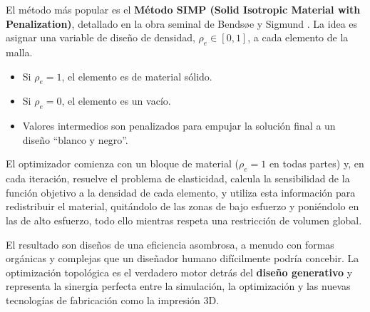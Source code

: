 El método más popular es el \textbf{Método SIMP (Solid Isotropic Material with Penalization)}, detallado en la obra seminal de Bendsøe y Sigmund \cite{Bendsoe2003}. La idea es asignar una variable de diseño de densidad, \(\rho_e \in [0,1]\), a cada elemento de la malla.
\begin{itemize}
    \item Si \(\rho_e = 1\), el elemento es de material sólido.
    \item Si \(\rho_e = 0\), el elemento es un vacío.
    \item Valores intermedios son penalizados para empujar la solución final a un diseño ``blanco y negro''.
\end{itemize}
El optimizador comienza con un bloque de material (\(\rho_e=1\) en todas partes) y, en cada iteración, resuelve el problema de elasticidad, calcula la sensibilidad de la función objetivo a la densidad de cada elemento, y utiliza esta información para redistribuir el material, quitándolo de las zonas de bajo esfuerzo y poniéndolo en las de alto esfuerzo, todo ello mientras respeta una restricción de volumen global.

El resultado son diseños de una eficiencia asombrosa, a menudo con formas orgánicas y complejas que un diseñador humano difícilmente podría concebir. La optimización topológica es el verdadero motor detrás del \textbf{diseño generativo} y representa la sinergia perfecta entre la simulación, la optimización y las nuevas tecnologías de fabricación como la impresión 3D.